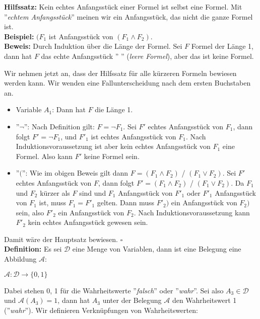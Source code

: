 \documentclass[a4paper]{scrartcl}
\begin{document}
\textbf{Hilfssatz:} Kein echtes Anfangsstück einer Formel ist selbst eine Formel. Mit ''\textit{echtem Anfangsstück}'' meinen wir ein Anfangsstück, das nicht die ganze Formel ist.\\
\textbf{Beispiel:} $(F_1$ ist Anfangsstück von $(F_1 \wedge F_2)$.\\
\textbf{Beweis:} Durch Induktion über die Länge der Formel. Sei $F$ Formel der Länge 1, dann hat $F$ das echte Anfangsstück '' '' (\textit{leere Formel}), aber das ist keine Formel.\\ 

\newpage

Wir nehmen jetzt an, dass der Hilfssatz für alle kürzeren Formeln bewiesen werden kann. Wir wenden eine Fallunterscheidung nach dem ersten Buchstaben an.
\begin{itemize}
\item Variable $A_1$: Dann hat $F$ die Länge 1.
\item ''$\neg$'': Nach Definition gilt: $F = \neg F_1$. Sei $F'$ echtes Anfangsstück von $F_1$, dann folgt $F' = \neg F_1$, und $F'_1$ ist echtes Anfangsstück von $F_1$. Nach Induktionsvoraussetzung ist aber kein echtes Anfangsstück von $F_1$ eine Formel. Also kann $F'$ keine Formel sein.
\item ''$($'': Wie im obigen Beweis gilt dann $F = (F_1 \wedge F_2)$ / $(F_1 \vee F_2)$. Sei $F'$ echtes Anfangsstück von $F$, dann folgt $F' = (F_1 \wedge F_2)$ / $(F_1 \vee F_2)$. Da $F_1$ und $F_2$ kürzer als $F$ sind und $F_1$ Anfangsstück von $F'_1$ oder $F'_1$ Anfangsstück von $F_1$ ist, muss $F_1 = F'_1$ gelten. Dann muss $F'_2)$ ein Anfangsstück von $F_2)$ sein, also $F'_2$ ein Anfangsstück von $F_2$. Nach Induktionsvoraussetzung kann $F'_2$ kein echtes Anfangsstück gewesen sein.
\end{itemize}
Damit wäre der Hauptsatz bewiesen. $\square$\\
\textbf{Definition:} Es sei $\mathcal{D}$ eine Menge von Variablen, dann ist eine Belegung eine Abbildung $\mathcal{A}$:
\begin{center}
$\mathcal{A}: \mathcal{D} \rightarrow \{0, 1\}$
\end{center}
Dabei stehen 0, 1 für die Wahrheitswerte ''\textit{falsch}'' oder ''\textit{wahr}''. Sei also $A_3 \in \mathcal{D}$ und $\mathcal{A}(A_3) = 1$, dann hat $A_3$ unter der Belegung $\mathcal{A}$ den Wahrheitswert 1 (''\textit{wahr}''). Wir definieren Verknüpfungen von Wahrheitswerten:
\end{document}
